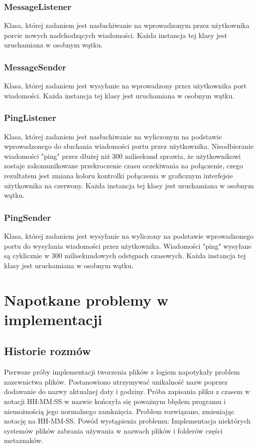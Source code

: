 \documentclass[a4paper,11pt]{article}
\begin{document}
\subsubsection{MessageListener}
Klasa, której zadaniem jest nasłuchiwanie na wprowadzonym przez użytkownika porcie nowych nadchodzących wiadomości.\newline
Każda instancja tej klasy jest uruchamiana w osobnym wątku.

\subsubsection{MessageSender}
Klasa, której zadaniem jest wysyłanie na wprowadzony przez użytkownika port wiadomości.\newline
Każda instancja tej klasy jest uruchamiana w osobnym wątku.

\subsubsection{PingListener}
Klasa, której zadaniem jest nasłuchiwanie na wyliczonym na podstawie wprowadzonego do słuchania wiadomości portu przez użytkownika.\newline
Nieodbieranie wiadomości "ping" przez dłużej niż 300 milisekund sprawia, że użytkownikowi zostaje zakomunikowane przekroczenie czasu oczekiwania
na połączenie, czego rezultatem jest zmiana koloru kontrolki połączenia w graficznym interfejsie użytkownika na czerwony.
Każda instancja tej klasy jest uruchamiana w osobnym wątku.

\subsubsection{PingSender}
Klasa, której zadaniem jest wysyłanie na wyliczony na podstawie wprowadzonego portu do wysyłania wiadomości przez użytkownika.\newline
Wiadomości "ping" wysyłane są cyklicznie w 300 milisekundowych odstępach czasowych.
Każda instancja tej klasy jest uruchamiana w osobnym wątku.

\section{Napotkane problemy w implementacji}

\subsection{Historie rozmów}
Pierwsze próby implementacji tworzenia plików z logiem napotykały problem nazewnictwa plików. Postanowiono utrzymywać unikalność nazw poprzez dodawanie 
do nazwy aktualnej daty i godziny. Próba zapisania pliku z czasem w notacji HH:MM:SS w nazwie kończyła się poważnym błędem programu i niemożnością jego normalnego
zamknięcia. Problem rozwiązano, zmieniając notację na HH-MM-SS. Powód wystąpienia problemu: Implementacja niektórych systemów plików zabrania używania w nazwach plików i folderów części metaznaków.
\end{document}
